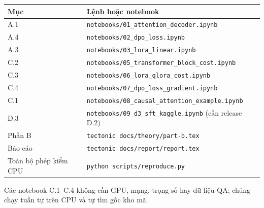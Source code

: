 \begin{center}
\begin{tabular}{ll}
\toprule
\textbf{Mục} & \textbf{Lệnh hoặc notebook}\\
\midrule
A.1 & \texttt{notebooks/01\_attention\_decoder.ipynb}\\
A.4 & \texttt{notebooks/02\_dpo\_loss.ipynb}\\
A.3 & \texttt{notebooks/03\_lora\_linear.ipynb}\\
C.2 & \texttt{notebooks/05\_transformer\_block\_cost.ipynb}\\
C.3 & \texttt{notebooks/06\_lora\_qlora\_cost.ipynb}\\
C.4 & \texttt{notebooks/07\_dpo\_loss\_gradient.ipynb}\\
C.1 & \texttt{notebooks/08\_causal\_attention\_example.ipynb}\\
D.3 & \texttt{notebooks/09\_d3\_sft\_kaggle.ipynb} (cần release D.2)\\
Phần B & \texttt{tectonic docs/theory/part-b.tex}\\
Báo cáo & \texttt{tectonic docs/report/report.tex}\\
Toàn bộ phép kiểm CPU & \texttt{python scripts/reproduce.py}\\
\bottomrule
\end{tabular}
\end{center}

Các notebook C.1--C.4 không cần GPU, mạng, trọng số hay dữ liệu QA; chúng chạy tuần
tự trên CPU và tự tìm gốc kho mã.

